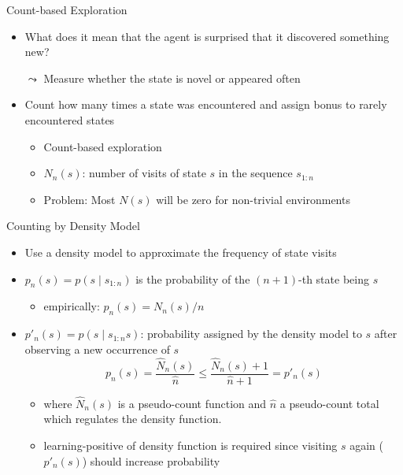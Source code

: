 \documentclass[aspectratio=169]{../latex_main/tntbeamer}  %
\begin{document}
\begin{frame}[c]{Count-based Exploration}
	
	\begin{itemize}
		\item What does it mean that the agent is surprised that it discovered something new?
		\item[$\leadsto$] Measure whether the state is novel or appeared often
		\item Count how many times a state was encountered and assign bonus to rarely encountered states
		\begin{itemize}
			\item Count-based exploration
			\item $N_n(s)$: number of visits of state $s$ in the sequence $s_{1:n}$
			\item Problem: Most $N(s)$ will be zero for non-trivial environments
		\end{itemize}
	\end{itemize}
	
\end{frame}
\begin{frame}[c]{Counting by Density Model~}
	
	\begin{itemize}
		\item Use a density model to approximate the frequency of state visits
		\item $p_n(s) = p(s \mid s_{1:n})$ is the probability of the $(n+1)$-th state being $s$
		\begin{itemize}
			\item empirically: $p_n(s) = N_n(s) / n$
		\end{itemize}
		\item $p'_n(s) = p(s \mid s_{1:n} s)$: probability assigned by the density model to $s$ after observing a new occurrence of $s$
		$$p_n(s) =  \frac{\hat{N}_n(s)}{\hat{n}} \leq \frac{\hat{N}_n(s) + 1}{\hat{n} + 1} = p'_n(s)$$
		\begin{itemize}
			\item where $\hat{N}_n(s)$ is a pseudo-count function and $\hat{n}$ a pseudo-count total which regulates the density function.
			\item learning-positive of density function is required since visiting $s$ again ($p'_n(s)$) should increase probability
		\end{itemize}
	\end{itemize}
	
\end{frame}
\end{document}

